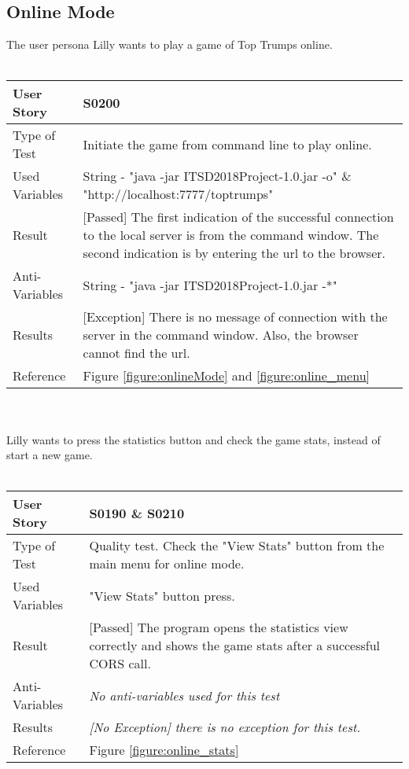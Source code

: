 \subsection{Online Mode}
\vspace{0.2cm} 
The user persona Lilly wants to play a game of Top Trumps online.\\
\vspace{0.2cm}\\  
\begin{tabular}{l | p{12cm}}
User Story & \textbf{S0200}\\ \hline
Type of Test & Initiate the game from command line to play online.\\ \hline
Used Variables & String - "java -jar ITSD2018Project-1.0.jar -o" \& "http://localhost:7777/toptrumps"\\ \hline
Result & [Passed] The first indication of the successful connection to the local server is from the command window. The second indication is by entering the url to the browser.\\ \hline
Anti-Variables & String - "java -jar ITSD2018Project-1.0.jar -*"\\ \hline
Results & [Exception] There is no message of connection with the server in the command window. Also, the browser cannot find the url.\\ \hline
Reference & Figure \ref{figure:onlineMode} and \ref{figure:online_menu} \\ \hline
\end{tabular}\\
\vspace{0.2cm}\\
Lilly wants to press the statistics button and check the game stats, instead of start a new game.\\
\vspace{0.2cm}\\  
\begin{tabular}{l | p{12cm}}
User Story & \textbf{S0190} \& \textbf{S0210}\\ \hline
Type of Test & Quality test. Check the "View Stats" button from the main menu for online mode.\\ \hline
Used Variables & "View Stats" button press.\\ \hline
Result & [Passed] The program opens the statistics view correctly and shows the game stats after a successful CORS call.\\ \hline
Anti-Variables & \textit{No anti-variables used for this test}\\ \hline
Results & \textit{[No Exception] there is no exception for this test.}\\ \hline
Reference & Figure \ref{figure:online_stats}\\ \hline
\end{tabular}\\
